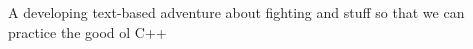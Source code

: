 A developing text-\/based adventure about fighting and stuff so that we can practice the good ol\textquotesingle{} C++ 